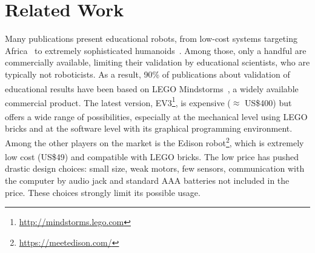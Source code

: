 \documentclass[letterpaper, 10 pt, conference]{ieeeconf}  %
\begin{document}
\section{Related Work}

Many publications present educational robots, from low-cost systems targeting Africa~\cite{Rubenstein2015,Gyebi2015} to extremely sophisticated humanoids~\cite{Hood2015,Mazzoni2016}. 
Among those, only a handful are commercially available, limiting their validation by educational scientists, who are typically not roboticists.
As a result, 90\% of publications about validation of educational results have been based on LEGO\textsuperscript{\textregistered} Mindstorms\textsuperscript{\textregistered}~\cite{benitti2012exploring}, a widely available commercial product.
The latest version, EV3\footnote{\url{http://mindstorms.lego.com}}, is expensive ($\approx$ US\$400) but offers a wide range of possibilities, especially at the mechanical level using LEGO\textsuperscript{\textregistered} bricks and at the software level with its graphical programming environment. 
Among the other players on the market is the Edison robot\footnote{\url{https://meetedison.com/}}, which is extremely low cost (US\$49) and compatible with LEGO\textsuperscript{\textregistered} bricks. 
The low price has pushed drastic design choices: small size, weak motors, few sensors, communication with the computer by audio jack and standard AAA batteries not included in the price.
These choices strongly limit its possible usage.
\end{document}
